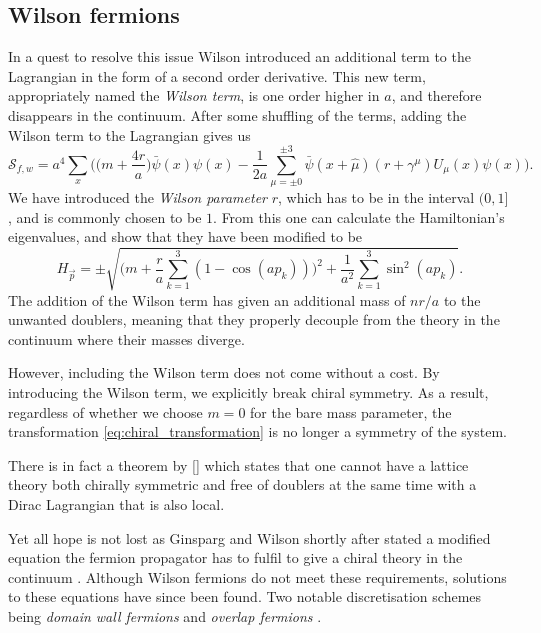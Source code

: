 \subsection{Wilson fermions}

In a quest to resolve this issue Wilson introduced an additional term to the
Lagrangian in the form of a second order derivative. This new term,
appropriately named the \emph{Wilson term}, is one order higher in $a$, and therefore
disappears in the continuum. After some shuffling of the terms, adding the
Wilson term to the Lagrangian gives us
%
\begin{equation} \label{eq:wilson_action}
  \mathcal{S}_{f,w} = a^4 \sum_{x} \bigg(
  \big(m + {\textstyle\frac{4 r}{a}}\big) \bar{\psi}(x) \psi(x)
  - \frac{1}{2a} \sum_{\mu = \pm 0}^{\pm 3} \bar{\psi}(x+\hat{\mu}) (r +
  \gamma^{\mu}) U_{\mu}(x) \psi(x) \bigg).
\end{equation}
%
We have introduced the \emph{Wilson parameter} $r$, which has to be in the
interval $(0, 1]$, and is commonly chosen to be $1$. From this one can calculate
the Hamiltonian's eigenvalues, and show that they have been modified to be
%
\begin{equation}
  H_{\vec{p}} = \pm \sqrt{\bigg(m + \frac{r}{a}\sum_{k=1}^3 (1 - \cos (a p_k) ) \bigg)^2
    + \frac{1}{a^2} \sum_{k=1}^3 \sin^2 (a p_k)}.
\end{equation}
%
The addition of the Wilson term has given an additional mass of $n r/a$ to the
unwanted doublers, meaning that they properly decouple from the theory in the
continuum where their masses diverge. 

However, including the Wilson term does not come without a cost. By introducing
the Wilson term, we explicitly break chiral symmetry. As a result, regardless of
whether we choose $m=0$ for the bare mass parameter, the transformation
\eqref{eq:chiral_transformation} is no longer a symmetry of the system. 

There is in fact a theorem by \citeauthor{Nielsen:1980rz}
[\citeyear{Nielsen:1980rz,Nielsen:1981xu}] which states that one cannot have a
lattice theory both chirally symmetric and free of doublers at the same time
with a Dirac Lagrangian that is also local.

Yet all hope is not lost as Ginsparg and Wilson shortly after stated a modified
equation the fermion propagator has to fulfil to give a chiral theory in the
continuum \citep{Ginsparg:1981bj}. Although Wilson fermions do not meet these
requirements, solutions to these equations have since been found. Two notable
discretisation schemes being \emph{domain wall fermions} \citep{Kaplan:1992bt} and 
\emph{overlap fermions} \citep{Neuberger:1997fp,Neuberger:1998wv}.

